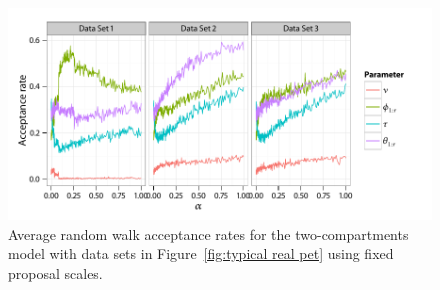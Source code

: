 \begin{figure}[t]
  \UseAltLinespread
  \includegraphics[width=\linewidth]{fig_src/Fixed_Proposal}
  \caption[Acceptance rates of non-adaptive \protect\smc algorithms]
  {Average random walk acceptance rates for the two-compartments \pet model
    with data sets in Figure~\ref{fig:typical real pet} using fixed proposal
    scales.}
  \label{fig:pet fixed proposal}
\end{figure}
